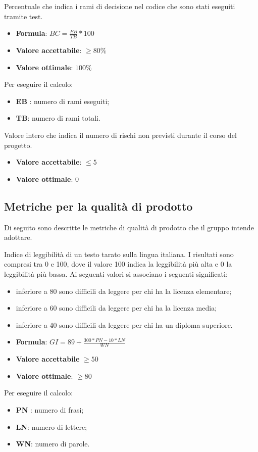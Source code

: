 Percentuale che indica i rami di decisione nel codice che sono stati eseguiti tramite test.
\begin{itemize}
    \item \textbf{Formula}: $BC = \frac{EB}{TB}*100$
    \item \textbf{Valore accettabile}: $\geq80\%$
    \item \textbf{Valore ottimale}: $100\%$
\end{itemize}  
Per eseguire il calcolo:
\begin{itemize}
    \item \textbf{EB} : numero di rami eseguiti;
    \item \textbf{TB}: numero di rami totali.
\end{itemize}

Valore intero che indica il numero di rischi non previsti durante il corso del progetto.
\begin{itemize}
    \item \textbf{Valore accettabile}: $\leq5$
    \item \textbf{Valore ottimale}: $0$
\end{itemize}  


\pagebreak
\setcounter{M}{0}
\subsection{Metriche per la qualità di prodotto}
Di seguito sono descritte le metriche di qualità di prodotto che il gruppo intende adottare.

Indice di leggibilità di un testo tarato sulla lingua italiana. I risultati sono compresi tra 0 e
100, dove il valore 100 indica la leggibilità più alta e 0 la leggibilità più bassa. Ai seguenti valori si
associano i seguenti significati:
\begin{itemize}
    \item inferiore a 80 sono difficili da leggere per chi ha la licenza elementare;
    \item inferiore a 60 sono difficili da leggere per chi ha la licenza media;
    \item inferiore a 40 sono difficili da leggere per chi ha un diploma superiore.
\end{itemize}
\begin{itemize}
    \item \textbf{Formula}: $GI=89+\frac{300*PN-10*LN}{WN}$
    \item \textbf{Valore accettabile} $\geq50$
    \item \textbf{Valore ottimale}: $\geq80$
\end{itemize}  
Per eseguire il calcolo:
\begin{itemize}
    \item \textbf{PN} : numero di frasi;
    \item \textbf{LN}: numero di lettere;
    \item \textbf{WN}: numero di parole.
\end{itemize}

